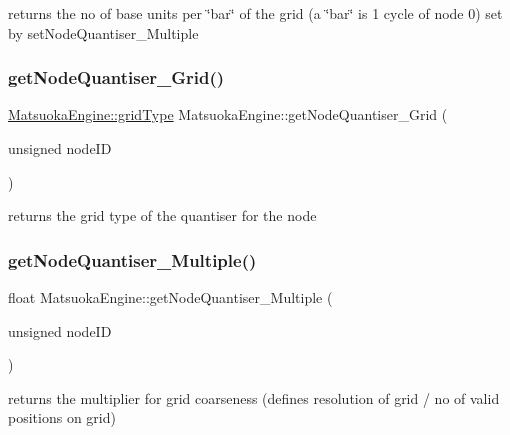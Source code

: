 returns the no of base units per \char`\"{}bar\char`\"{} of the grid (a \char`\"{}bar\char`\"{} is 1 cycle of node 0) set by set\+Node\+Quantiser\+\_\+\+Multiple \mbox{\label{classMatsuokaEngine_adce59f3e8b45ab4c0ca804b17d8eb749}} 
\subsubsection{\texorpdfstring{get\+Node\+Quantiser\+\_\+\+Grid()}{getNodeQuantiser\_Grid()}}
{\footnotesize\ttfamily \mbox{\hyperlink{classQuantisedEventQueue_ae186d50bd503038452edbbdd0c7c259e}{Matsuoka\+Engine\+::grid\+Type}} Matsuoka\+Engine\+::get\+Node\+Quantiser\+\_\+\+Grid (\begin{DoxyParamCaption}\item[{unsigned}]{node\+ID }\end{DoxyParamCaption})}



returns the grid type of the quantiser for the node 

\mbox{\label{classMatsuokaEngine_a1d0b1a452f3d9252d460177779b2d681}} 
\subsubsection{\texorpdfstring{get\+Node\+Quantiser\+\_\+\+Multiple()}{getNodeQuantiser\_Multiple()}}
{\footnotesize\ttfamily float Matsuoka\+Engine\+::get\+Node\+Quantiser\+\_\+\+Multiple (\begin{DoxyParamCaption}\item[{unsigned}]{node\+ID }\end{DoxyParamCaption})}



returns the multiplier for grid coarseness (defines resolution of grid / no of valid positions on grid) 

\mbox{\label{classMatsuokaEngine_a05ab0eeb8a7d0b7f3a478ba41735cb8d}} 
